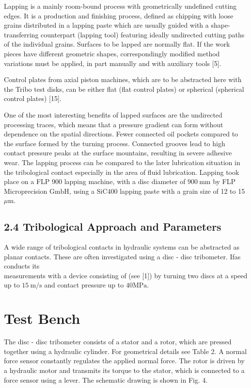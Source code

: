 \documentclass[10pt]{article}
\begin{document}
Lapping is a mainly room-bound process with geometrically undefined cutting edges. It is a production and finishing process, defined as chipping with loose grains distributed in a lapping paste which are usually guided with a shape-transferring counterpart (lapping tool) featuring ideally undirected cutting paths of the individual grains. Surfaces to be lapped are normally flat. If the work pieces have different geometric shapes, correspondingly modified method variations must be applied, in part manually and with auxiliary tools [5].

Control plates from axial piston machines, which are to be abstracted here with the Tribo test disks, can be either flat (flat control plates) or spherical (spherical control plates) [15].

One of the most interesting benefits of lapped surfaces are the undirected processing traces, which means that a pressure gradient can form without dependence on the spatial directions. Fewer connected oil pockets compared to the surface formed by the turning process. Connected grooves lead to high contact pressure peaks at the surface mountains, resulting in severe adhesive wear. The lapping process can be compared to the later lubrication situation in the tribological contact especially in the area of fluid lubrication. Lapping took place on a FLP 900 lapping machine, with a disc diameter of $900 \mathrm{~mm}$ by FLP Microprecision $\mathrm{GmbH}$, using a $\mathrm{SiC400}$ lapping paste with a grain size of 12 to 15 $\mu \mathrm{m}$.

\subsection*{2.4 Tribological Approach and Parameters}
A wide range of tribological contacts in hydraulic systems can be abstracted as planar contacts. These are often investigated using a disc - disc tribometer. Ifas conducts its\\
measurements with a device consisting of (see [1]) by turning two discs at a speed up to $15 \mathrm{~m} / \mathrm{s}$ and contact pressure up to $40 \mathrm{MPa}$.

\section*{Test Bench}
The disc - disc tribometer consists of a stator and a rotor, which are pressed together using a hydraulic cylinder. For geometrical details see Table 2. A normal force sensor constantly regulates the applied normal force. The rotor is driven by a hydraulic motor and transmits its torque to the stator, which is connected to a force sensor using a lever. The schematic drawing is shown in Fig. 4.
\end{document}
